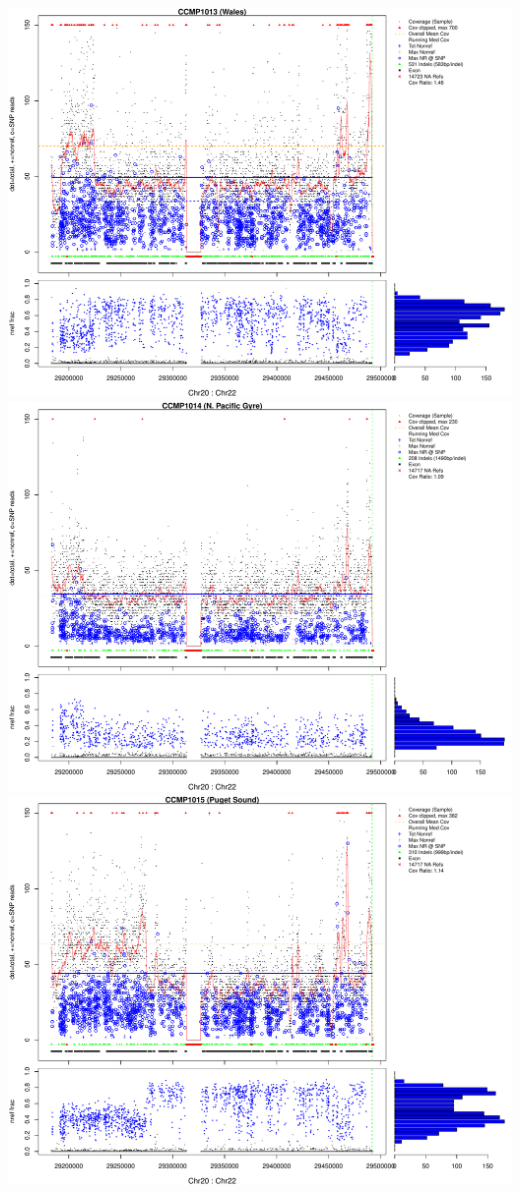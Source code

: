 \documentclass{article}\usepackage[]{graphicx}\usepackage[]{color}
\begin{document}
\includegraphics[width=\textwidth]{figs-mine/chr20x7-04.pdf}
\includegraphics[width=\textwidth]{figs-mine/chr20x7-05.pdf}
\includegraphics[width=\textwidth]{figs-mine/chr20x7-06.pdf}
\end{document}
